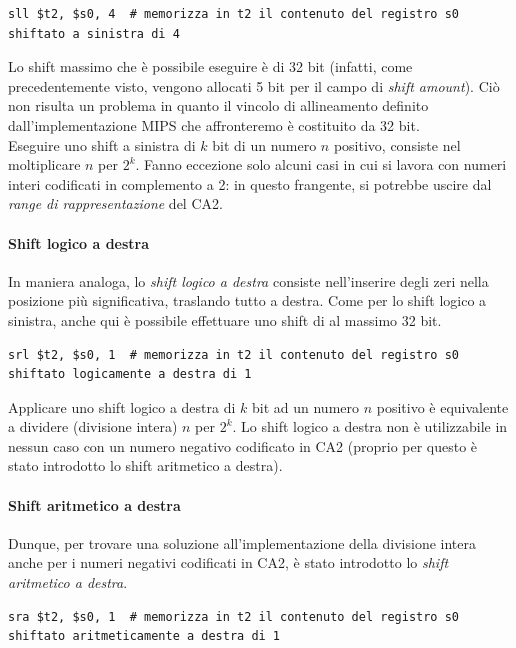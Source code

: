 \documentclass[class=book, crop=false]{standalone}
\begin{document}
\begin{verbatim}
sll $t2, $s0, 4  # memorizza in t2 il contenuto del registro s0 shiftato a sinistra di 4
\end{verbatim}

Lo shift massimo che è possibile eseguire è di 32 bit (infatti, come precedentemente visto, vengono allocati 5 bit per il campo di \emph{shift amount}). Ciò non risulta un problema in quanto il vincolo di allineamento definito dall'implementazione MIPS che affronteremo è costituito da 32 bit.\\
Eseguire uno shift a sinistra di \(k\) bit di un numero \(n\) positivo, consiste nel moltiplicare \(n\) per \(2^k\). Fanno eccezione solo alcuni casi in cui si lavora con numeri interi codificati in complemento a 2: in questo frangente, si potrebbe uscire dal \emph{range di rappresentazione} del CA2.

\paragraph{Shift logico a destra}
In maniera analoga, lo \emph{shift logico a destra} consiste nell'inserire degli zeri nella posizione più significativa, traslando tutto a destra. Come per lo shift logico a sinistra, anche qui è possibile effettuare uno shift di al massimo 32 bit.

\begin{verbatim}
srl $t2, $s0, 1  # memorizza in t2 il contenuto del registro s0 shiftato logicamente a destra di 1
\end{verbatim}

Applicare uno shift logico a destra di \(k\) bit ad un numero \(n\) positivo è equivalente a dividere (divisione intera) \(n\) per \(2^k\). Lo shift logico a destra non è utilizzabile in nessun caso con un numero negativo codificato in CA2 (proprio per questo è stato introdotto lo shift aritmetico a destra).

\paragraph{Shift aritmetico a destra}
Dunque, per trovare una soluzione all'implementazione della divisione intera anche per i numeri negativi codificati in CA2, è stato introdotto lo \emph{shift aritmetico a destra}.

\begin{verbatim}
sra $t2, $s0, 1  # memorizza in t2 il contenuto del registro s0 shiftato aritmeticamente a destra di 1
\end{verbatim}
\end{document}
